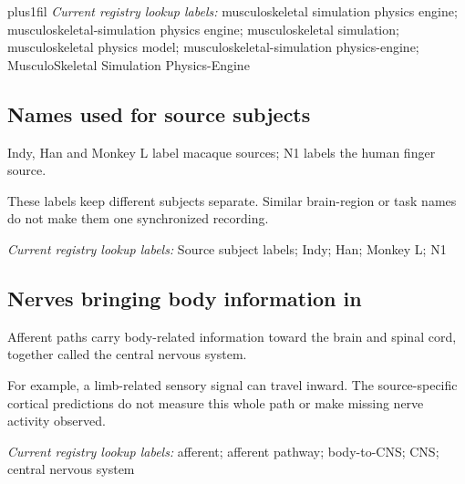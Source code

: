 {\rightskip=0pt plus1fil\relax
\noindent\textit{Current registry lookup labels:} musculoskeletal simulation physics engine; musculoskeletal-simulation physics engine; musculoskeletal simulation; musculoskeletal physics model; musculoskeletal-simulation physics-engine; MusculoSkeletal Simulation Physics-Engine\par
}

\begin{samepage}
\subsection*{Names used for source subjects}
\noindent Indy, Han and Monkey L label macaque sources; N1 labels the human finger source.\par
\end{samepage}
\begin{samepage}
\noindent These labels keep different subjects separate. Similar brain-region or task names do not make them one synchronized recording.\par\nopagebreak[4]

\end{samepage}


\noindent\textit{Current registry lookup labels:} Source subject labels; Indy; Han; Monkey L; N1\par

\begin{samepage}
\subsection*{Nerves bringing body information in}
\noindent Afferent paths carry body-related information toward the brain and spinal cord, together called the central nervous system.\par
\end{samepage}
\begin{samepage}
\noindent For example, a limb-related sensory signal can travel inward. The source-specific cortical predictions do not measure this whole path or make missing nerve activity observed.\par\nopagebreak[4]

\end{samepage}


\noindent\textit{Current registry lookup labels:} afferent; afferent pathway; body-to-CNS; CNS; central nervous system\par

